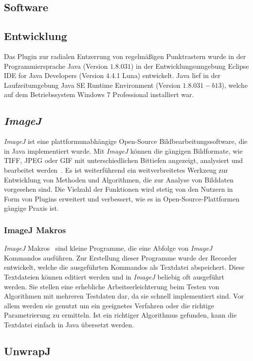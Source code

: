 \subsection{Software}

\subsection{Entwicklung}
Das Plugin zur radialen Entzerrung von regelmäßigen Punktrastern wurde in der Programmiersprache Java (Version $ 1.8.0 31 $) in der Entwicklungsumgebung Eclipse IDE for Java Developers (Version 4.4.1 Luna) entwickelt. Java lief in der Laufzeitumgebung Java SE Runtime Environment (Version $ 1.8.0 31-b13 $), welche auf dem Betriebssystem Windows 7 Professional installiert war.

\subsection{\textit{ImageJ}}
\textit{ImageJ} ist eine plattformunabhängige Open-Source Bildbearbeitungssoftware, die in Java implementiert wurde. Mit \textit{ImageJ} können die gängigen Bildformate, wie TIFF, JPEG oder GIF mit unterschiedlichen Bittiefen angezeigt, analysiert und bearbeitet werden~\cite{Collins_ImageJ}. Es ist weiterführend ein weitverbreitetes Werkzeug zur Entwicklung von Methoden und Algorithmen, die zur Analyse von Bilddaten vorgesehen sind. Die Vielzahl der Funktionen wird stetig von den Nutzern in Form von Plugins erweitert und verbessert, wie es in Open-Source-Plattformen gängige Praxis ist.
\subsubsection{ImageJ Makros}	
\textit{ImageJ} Makros~\cite{JMacros} sind kleine Programme, die eine Abfolge von \textit{ImageJ} Kommandos ausführen. Zur Erstellung dieser Programme wurde der Recorder entwickelt, welche die ausgeführten Kommandos als Textdatei abspeichert. Diese Textdateien können editiert werden und in \textit{ImageJ} beliebig oft ausgeführt werden. Sie stellen eine erhebliche Arbeitserleichterung beim Testen von Algorithmen mit mehreren Testdaten dar, da sie schnell implementiert sind. Vor allem werden sie genutzt um ein geeignetes Verfahren oder die richtige Parametrierung zu ermitteln. Ist ein richtiger Algorithmus gefunden, kann die Textdatei einfach in Java übersetzt werden.



\subsection{UnwrapJ}

